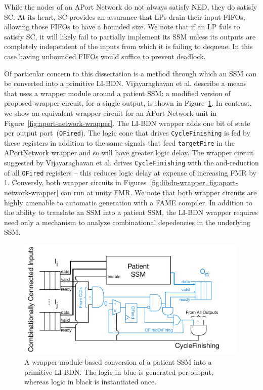 While the nodes of an APort Network do not always satisfy NED, they do satisfy
SC. At its heart, SC provides an assurance that LPs drain their input FIFOs,
allowing those FIFOs to have a bounded size. We note that if an LP fails to satisfy
SC, it will likely fail to partially implement its SSM unless its outputs are
completely independent of the inputs from which it is failing to dequeue. In
this case having unbounded FIFOs would suffice to prevent deadlock.

Of particular concern to this dissertation is a method through which an SSM can
be converted into a primitive LI-BDN.  Vijayaraghavan et al. describe a means
that uses a wrapper module around a patient SSM: a modified version of proposed wrapper circuit, for a
single output, is shown in Figure~\ref{fig:libdn-wrapper}. In contrast, we show an equivalent wrapper
circuit for an APort Network unit in Figure~\ref{fig:aport-network-wrapper}.
The LI-BDN wrapper adds one bit of state per output port~(\texttt{OFired}). The logic cone that drives
\texttt{CycleFinishing} is fed by these registers in addition to the same signals that feed
\texttt{targetFire} in the APortNetwork wrapper and so will have greater logic delay. The wrapper circuit
suggested by Vijayaraghavan et al. drives \texttt{CycleFinishing} with the and-reduction of all \texttt{OFired}
registers -- this reduces logic delay at expense of increasing FMR by 1. Conversly, both wrapper
circuits in Figures~\ref{fig:libdn-wrapper, fig:aport-network-wrapper} can run at unity FMR.
We note that both wrapper circuits are highly amenable to automatic generation with a FAME compiler.
In addition to the ability to translate an SSM into a patient SSM, the LI-BDN wrapper requires
need only a mechanism to analyze combinational depedencies in the underlying SSM.

\begin{figure}
    \centering
    \includegraphics[width=0.99\textwidth]{figures/libdn-wrapper.pdf}
    \caption{A wrapper-module-based conversion of a patient SSM into a primitive LI-BDN. The logic in blue
    is generated per-output, whereas logic in black is instantiated once.}
    \label{fig:libdn-wrapper}
\end{figure}


